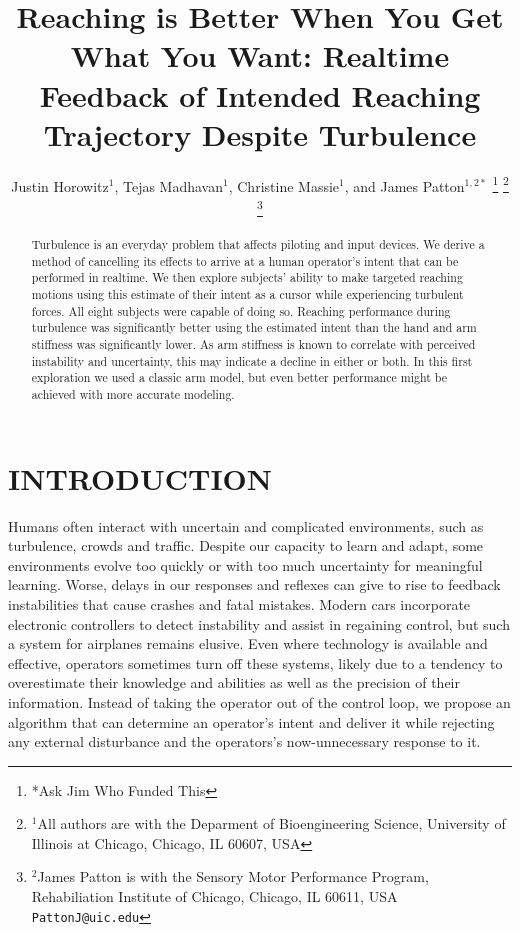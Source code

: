 \documentclass[letterpaper, 10 pt, conference]{ieeeconf}  %
\title{\LARGE \bf
Reaching is Better When You Get What You Want: Realtime Feedback of Intended Reaching Trajectory Despite Turbulence
}
\author{Justin Horowitz$^{1}$, Tejas Madhavan$^{1}$, Christine Massie$^{1}$, and James Patton$^{1,2*}$%
\thanks{*Ask Jim Who Funded This}%
\thanks{$^{1}$All authors are with the Deparment of Bioengineering Science, University of Illinois at Chicago, 
		Chicago, IL 60607, USA 
		}
\thanks{$^{2}$James Patton is with the Sensory Motor Performance Program, Rehabiliation Institute of Chicago,
       Chicago, IL 60611, USA
       {\tt\small PattonJ@uic.edu}}%
}
\begin{document}
\maketitle
\thispagestyle{empty}
\pagestyle{empty}


\begin{abstract}
Turbulence is an everyday problem that affects piloting and input devices. We derive a method of cancelling its effects to arrive at a human operator's intent that can be performed in realtime. We then explore subjects' ability to make targeted reaching motions using this estimate of their intent as a cursor while experiencing turbulent forces. All eight subjects were capable of doing so. Reaching performance during turbulence was significantly better using the estimated intent than the hand and arm stiffness was significantly lower. As arm stiffness is known to correlate with perceived instability and uncertainty, this may indicate a decline in either or both. In this first exploration we used a classic arm model, but even better performance might be achieved with more accurate modeling.
\end{abstract}


\section{INTRODUCTION}

Humans often interact with uncertain and complicated environments, such as turbulence, crowds and traffic. Despite our capacity to learn and adapt, some environments evolve too quickly or with too much uncertainty for meaningful learning. Worse, delays in our responses and reflexes can give to rise to feedback instabilities that cause crashes and fatal mistakes\cite{mcruer1995pilot}. Modern cars incorporate electronic controllers to detect instability and assist in regaining control\cite{lie2006effectiveness}, but such a system for airplanes remains elusive\cite{newman2012thirty}. Even where technology is available and effective, operators sometimes turn off these systems\cite{itoh2013evaluation}, likely due to a tendency to overestimate their knowledge and abilities as well as the precision of their information\cite{del2012decision}. Instead of taking the operator out of the control loop, we propose an algorithm that can determine an operator's intent and deliver it while rejecting any external disturbance and the operators's now-unnecessary response to it.
\end{document}
